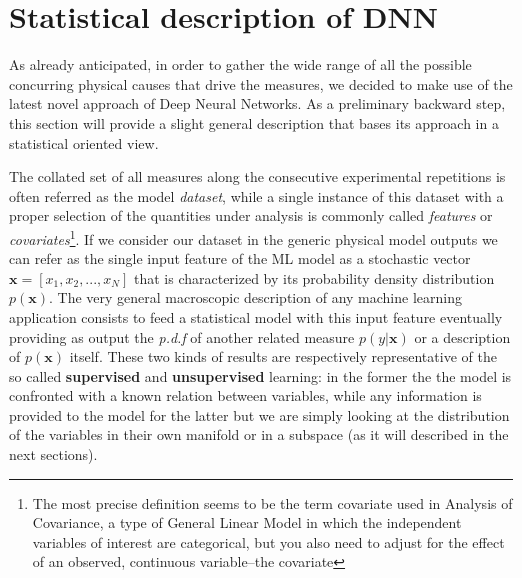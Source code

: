 \section{Statistical description of DNN}

As already anticipated, in order to gather the wide range of all the possible concurring physical causes that drive the measures, we decided to make use of the latest novel approach of Deep Neural Networks. As a preliminary backward step, this section will provide a slight general description that bases its approach in a statistical oriented view.

The collated set of all measures along the consecutive experimental repetitions is often referred as the model \textit{dataset}, while a single instance of this dataset with a proper selection of the quantities under analysis is commonly called \textit{features} or \textit{covariates}\footnote{The most precise definition seems to be the term covariate used in Analysis of Covariance, a type of General Linear Model in which the independent variables of interest are categorical, but you also need to adjust for the effect of an observed, continuous variable–the covariate}.
%
If we consider our dataset in the generic physical model outputs we can refer as the single input feature of the ML model as a stochastic vector $\bm{x} = [x_1,x_2, ... ,x_N]$ that is characterized by its probability density distribution $p(\bm{x})$. The very general macroscopic description of any machine learning application consists to feed a statistical model with this input feature eventually providing as output the \textit{p.d.f} of another related measure $p(y|\bm{x})$ or a description of $p(\bm{x})$ itself. These two kinds of results are respectively representative of the so called  \textbf{supervised} and \textbf{unsupervised} learning: in the former the the model is confronted with a known relation between variables, while any information is provided to the model for the latter but we are simply looking at the distribution of the variables in their own manifold or in a subspace (as it will described in the next sections).


